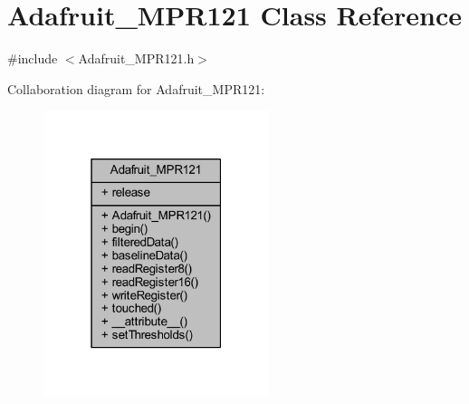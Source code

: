 \hypertarget{class_adafruit___m_p_r121}{}\section{Adafruit\+\_\+\+M\+P\+R121 Class Reference}
\label{class_adafruit___m_p_r121}


{\ttfamily \#include $<$Adafruit\+\_\+\+M\+P\+R121.\+h$>$}



Collaboration diagram for Adafruit\+\_\+\+M\+P\+R121\+:
\nopagebreak
\begin{figure}[H]
\begin{center}
\leavevmode
\includegraphics[width=187pt]{d3/d64/class_adafruit___m_p_r121__coll__graph}
\end{center}
\end{figure}
